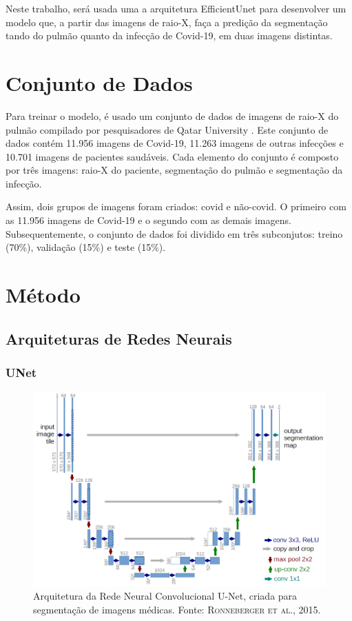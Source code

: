 \documentclass[a4,12pt]{horizon-theme}
\begin{document}
Neste trabalho, será usada uma a arquitetura EfficientUnet para desenvolver um modelo que, a partir das imagens de raio-X, faça a predição da segmentação tando do pulmão quanto da infecção de Covid-19, em duas imagens distintas.


\section{Conjunto de Dados}
\label{sec:dados}
Para treinar o modelo, é usado um conjunto de dados de imagens de raio-X do pulmão compilado por pesquisadores de Qatar University \citep{CovidDataset1, CovidDataset2}. Este conjunto de dados contém 11.956 imagens de Covid-19, 11.263 imagens de outras infecções e 10.701 imagens de pacientes saudáveis. Cada elemento do conjunto é composto por três imagens: raio-X do paciente, segmentação do pulmão e segmentação da infecção.

Assim, dois grupos de imagens foram criados: covid e não-covid. O primeiro com as 11.956 imagens de Covid-19 e o segundo com as demais imagens. Subsequentemente, o conjunto de dados foi dividido em três subconjutos: treino (70\%), validação (15\%) e teste (15\%).







\section{Método}
\subsection{Arquiteturas de Redes Neurais}

\subsubsection{UNet}
\label{sec:unet}
\begin{figure}[!ht]
  \includegraphics[width=\textwidth]{figures/unet.png}
  \caption{Arquitetura da Rede Neural Convolucional U-Net, criada para segmentação de imagens médicas. Fonte: \textsc{Ronneberger et al., 2015}.}
  \label{fig:unet}
\end{figure}
\end{document}
